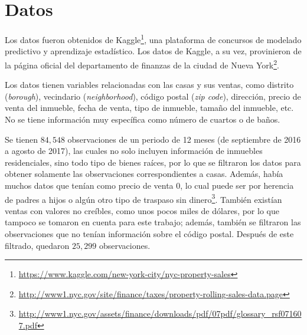 
\section{Datos}
\label{sec:datos}

Los datos fueron obtenidos de Kaggle\footnote{\url{https://www.kaggle.com/new-york-city/nyc-property-sales}}, una plataforma de concursos de modelado predictivo y aprendizaje estadístico. Los datos de Kaggle, a su vez, provinieron de la página oficial del departamento de finanzas de la ciudad de Nueva York\footnote{\url{http://www1.nyc.gov/site/finance/taxes/property-rolling-sales-data.page}}.

Los datos tienen variables relacionadas con las casas y sus ventas, como distrito (\textit{borough}), vecindario (\textit{neighborhood}), código postal (\textit{zip code}), dirección, precio de venta del inmueble, fecha de venta, tipo de inmueble, tamaño del inmueble, etc. No se tiene información muy específica como número de cuartos o de baños.

Se tienen $84,548$ observaciones de un periodo de 12 meses (de septiembre de 2016 a agosto de 2017), las cuales no solo incluyen información de inmuebles residenciales, sino todo tipo de bienes raíces, por lo que se filtraron los datos para obtener solamente las observaciones correspondientes a casas. Además, había muchos datos que tenían como precio de venta 0, lo cual puede ser por herencia de padres a hijos o algún otro tipo de traspaso sin dinero\footnote{\url{http://www1.nyc.gov/assets/finance/downloads/pdf/07pdf/glossary_rsf071607.pdf}}. También existían ventas con valores no creíbles, como unos pocos miles de dólares, por lo que tampoco se tomaron en cuenta para este trabajo; además, también se filtraron las observaciones que no tenían información sobre el código postal. Después de este filtrado, quedaron $25,299$ observaciones.




